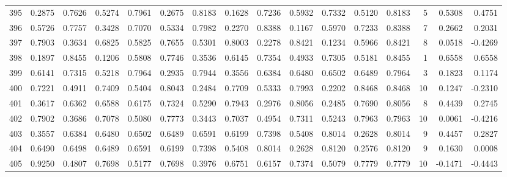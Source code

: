 \begin{tabular}{lrrrrrrrrrrrrrrr}
395 &      0.2875 &  0.7626 &  0.5274 &  0.7961 &  0.2675 &  0.8183 &  0.1628 &  0.7236 &  0.5932 &  0.7332 &   0.5120 &     0.8183 &      5 &                    0.5308 &                     0.4751 \\
396 &      0.5726 &  0.7757 &  0.3428 &  0.7070 &  0.5334 &  0.7982 &  0.2270 &  0.8388 &  0.1167 &  0.5970 &   0.7233 &     0.8388 &      7 &                    0.2662 &                     0.2031 \\
397 &      0.7903 &  0.3634 &  0.6825 &  0.5825 &  0.7655 &  0.5301 &  0.8003 &  0.2278 &  0.8421 &  0.1234 &   0.5966 &     0.8421 &      8 &                    0.0518 &                    -0.4269 \\
398 &      0.1897 &  0.8455 &  0.1206 &  0.5808 &  0.7746 &  0.3536 &  0.6145 &  0.7354 &  0.4933 &  0.7305 &   0.5181 &     0.8455 &      1 &                    0.6558 &                     0.6558 \\
399 &      0.6141 &  0.7315 &  0.5218 &  0.7964 &  0.2935 &  0.7944 &  0.3556 &  0.6384 &  0.6480 &  0.6502 &   0.6489 &     0.7964 &      3 &                    0.1823 &                     0.1174 \\
400 &      0.7221 &  0.4911 &  0.7409 &  0.5404 &  0.8043 &  0.2484 &  0.7709 &  0.5333 &  0.7993 &  0.2202 &   0.8468 &     0.8468 &     10 &                    0.1247 &                    -0.2310 \\
401 &      0.3617 &  0.6362 &  0.6588 &  0.6175 &  0.7324 &  0.5290 &  0.7943 &  0.2976 &  0.8056 &  0.2485 &   0.7690 &     0.8056 &      8 &                    0.4439 &                     0.2745 \\
402 &      0.7902 &  0.3686 &  0.7078 &  0.5080 &  0.7773 &  0.3443 &  0.7037 &  0.4954 &  0.7311 &  0.5243 &   0.7963 &     0.7963 &     10 &                    0.0061 &                    -0.4216 \\
403 &      0.3557 &  0.6384 &  0.6480 &  0.6502 &  0.6489 &  0.6591 &  0.6199 &  0.7398 &  0.5408 &  0.8014 &   0.2628 &     0.8014 &      9 &                    0.4457 &                     0.2827 \\
404 &      0.6490 &  0.6498 &  0.6489 &  0.6591 &  0.6199 &  0.7398 &  0.5408 &  0.8014 &  0.2628 &  0.8120 &   0.2576 &     0.8120 &      9 &                    0.1630 &                     0.0008 \\
405 &      0.9250 &  0.4807 &  0.7698 &  0.5177 &  0.7698 &  0.3976 &  0.6751 &  0.6157 &  0.7374 &  0.5079 &   0.7779 &     0.7779 &     10 &                   -0.1471 &                    -0.4443 \\

\end{tabular}
